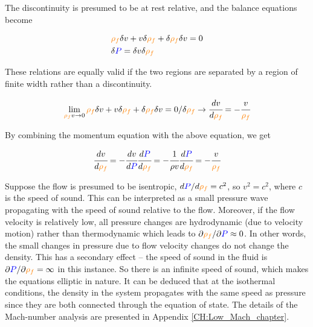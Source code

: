 \documentclass[a4paper,fleqn]{cas-dc}
\begin{document}
The discontinuity is presumed to be at rest relative, and the balance equations become		

{\footnotesize
	\begin{align*}
		&{\color{orange}\rho_f} \delta v + v \delta {\color{orange}\rho_f} + \delta {\color{orange}\rho_f} \delta v = 0 \\
		&\delta {\color{blue}P} = \delta v \delta {\color{orange}\rho_f}
	\end{align*}
}

These relations are equally valid if the two regions are separated by a region of finite width rather than a discontinuity. 

{\footnotesize
	\begin{equation*}
		\lim_{{\color{orange}\rho_f} v \rightarrow 0} {\color{orange}\rho_f} \delta v + v \delta {\color{orange}\rho_f} + \delta {\color{orange}\rho_f} \delta v = 0 / \delta {\color{orange}\rho_f} \rightarrow \cfrac{d v}{d {\color{orange}\rho_f}} = - \cfrac{v}{{\color{orange}\rho_f}}
	\end{equation*}
}

By combining the momentum equation with the above equation, we get

{\footnotesize
	\begin{equation} \label{EQ: Pressure_Velocity}
		\cfrac{d v}{d {\color{orange}\rho_f}} = - \cfrac{d v}{d{\color{blue}P}} \cfrac{d {\color{blue}P}}{d {\color{orange}\rho_f}} = -\cfrac{1}{\rho v} \cfrac{d{\color{blue}P}}{d{\color{orange}\rho_f}} = -\cfrac{v}{{\color{orange}\rho_f}}
	\end{equation}
}

Suppose the flow is presumed to be isentropic, $d{\color{blue}P}/d{\color{orange}\rho_f} = c^2$, so $v^2=c^2$, where $c$ is the speed of sound. This can be interpreted as a small pressure wave propagating with the speed of sound relative to the flow. Moreover, if the flow velocity is relatively low, all pressure changes are hydrodynamic (due to velocity motion) rather than thermodynamic which leads to $\partial {\color{orange}\rho_f} / \partial {\color{blue}P} \approx 0$. In other words, the small changes in pressure due to flow velocity changes do not change the density. This has a secondary effect -- the speed of sound in the fluid is $\partial {\color{blue}P}/\partial {\color{orange}\rho_f} = \infty$ in this instance. So there is an infinite speed of sound, which makes the equations elliptic in nature. It can be deduced that at the isothermal conditions, the density in the system propagates with the same speed as pressure since they are both connected through the equation of state. The details of the Mach-number analysis are presented in Appendix \ref{CH:Low_Mach_chapter}.
\end{document}
